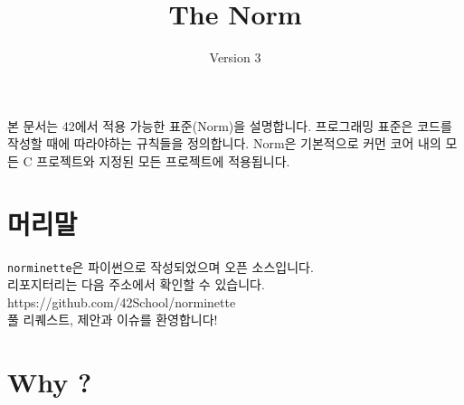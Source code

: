 \documentclass{42-ko}
\begin{document}
\title{The Norm}
\subtitle{Version 3}

\summary
{
    본 문서는 42에서 적용 가능한 표준(Norm)을 설명합니다.
    프로그래밍 표준은 코드를 작성할 때에 따라야하는 규칙들을 정의합니다.
    Norm은 기본적으로 커먼 코어 내의 모든 C 프로젝트와
    지정된 모든 프로젝트에 적용됩니다.
}

\maketitle

\tableofcontents



\chapter{머리말}

    \texttt{norminette}은 파이썬으로 작성되었으며 오픈 소스입니다. \\
    리포지터리는 다음 주소에서 확인할 수 있습니다. https://github.com/42School/norminette \\
    풀 리퀘스트, 제안과 이슈를 환영합니다!

    \newpage


        \chapter{Why ?}
\end{document}
